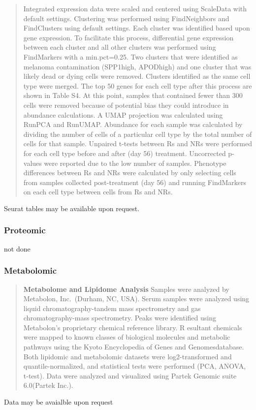 \documentclass[
]{article}
\begin{document}
\begin{quote}
Integrated expression data were scaled and centered using ScaleData with
default settings. Clustering was performed using FindNeighbors and
FindClusters using default settings. Each cluster was identified based
upon gene expression. To facilitate this process, differential gene
expression between each cluster and all other clusters was performed
using FindMarkers with a min.pct=0.25. Two clusters that were identified
as melanoma contamination (SPP1high, APODhigh) and one cluster that was
likely dead or dying cells were removed. Clusters identified as the same
cell type were merged. The top 50 genes for each cell type after this
process are shown in Table S4. At this point, samples that contained
fewer than 300 cells were removed because of potential bias they could
introduce in abundance calculations. A UMAP projection was calculated
using RunPCA and RunUMAP. Abundance for each sample was calculated by
dividing the number of cells of a particular cell type by the total
number of cells for that sample. Unpaired t-tests between Rs and NRs
were performed for each cell type before and after (day 56) treatment.
Uncorrected p-values were reported due to the low number of samples.
Phenotype differences between Rs and NRs were calculated by only
selecting cells from samples collected post-treatment (day 56) and
running FindMarkers on each cell type between cells from Rs and NRs.
\end{quote}

Seurat tables may be available upon request.

\hypertarget{proteomic}{%
\subsubsection{Proteomic}\label{proteomic}}

not done

\hypertarget{metabolomic}{%
\subsubsection{Metabolomic}\label{metabolomic}}

\begin{quote}
\textbf{Metabolome and Lipidome Analysis } Samples were analyzed by
Metabolon, Inc.~(Durham, NC, USA). Serum samples were analyzed using
liquid chromatography-tandem mass spectrometry and gas
chromatography-mass spectrometry. Peaks were identified using
Metabolon's proprietary chemical reference library. R esultant chemicals
were mapped to known classes of biological molecules and metabolic
pathways using the Kyoto Encyclopedia of Genes and Genomesdatabase. Both
lipidomic and metabolomic datasets were log2-transformed and
quantile-normalized, and statistical tests were performed (PCA, ANOVA,
t-test). Data were analyzed and visualized using Partek Genomic suite
6.0(Partek Inc.).
\end{quote}

Data may be avaialble upon request
\end{document}
